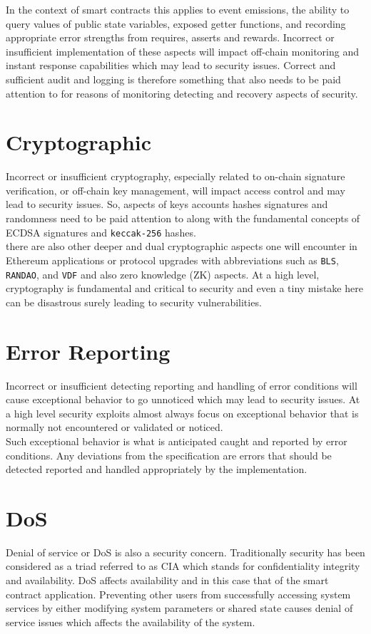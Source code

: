 In the context of smart contracts this applies to event emissions, the ability to query values of public state variables, exposed getter functions, and recording appropriate error strengths from requires, asserts and rewards. Incorrect or insufficient implementation of these aspects will impact off-chain monitoring and instant response capabilities which may lead to security issues. Correct and sufficient audit and logging is therefore something that also needs to be paid attention to for reasons of monitoring detecting and recovery aspects of security.

\section{Cryptographic}
Incorrect or insufficient cryptography, especially related to on-chain signature verification, or off-chain key management, will impact access control and may lead to security issues. So, aspects of keys accounts hashes signatures and randomness need to be paid attention to along with the fundamental concepts of ECDSA signatures and \verb|keccak-256| hashes.\\

there are also other deeper and dual cryptographic aspects one will encounter in Ethereum applications or protocol upgrades with abbreviations such as \verb|BLS|, \verb|RANDAO|, and \verb|VDF| and also zero knowledge (ZK) aspects. At a high level, cryptography is fundamental and critical to security and even a tiny mistake here can be disastrous surely leading to security vulnerabilities.

\section{Error Reporting}
Incorrect or insufficient detecting reporting and handling of error conditions will cause exceptional behavior to go unnoticed which may lead to security issues. At a high level security exploits almost always focus on exceptional behavior that is normally not encountered or validated or noticed.\\

Such exceptional behavior is what is anticipated caught and reported by error conditions. Any deviations from the specification are errors that should be detected reported and handled appropriately by the implementation.

\section{DoS}
Denial of service or DoS is also a security concern. Traditionally security has been considered as a triad referred to as CIA which stands for confidentiality integrity and availability. DoS affects availability and in this case that of the smart contract application. Preventing other users from successfully accessing system services by either modifying system parameters or shared state causes denial of service issues which affects the availability of the system.\\

